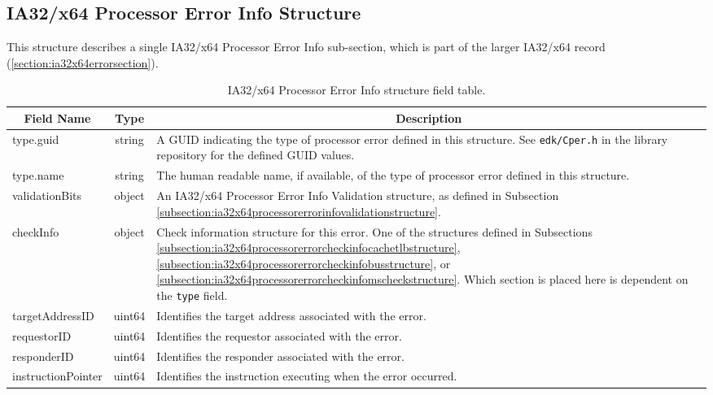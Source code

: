 \documentclass{report}
\newcommand*{\thead}[1]{\multicolumn{1}{|c|}{\bfseries #1}}
\newcommand*{\jsontable}[1]{
    \begin{table}[!ht]
    \label{#1}
    \centering
    \begin{adjustbox}{center}
    \begin{tabular}{|l|c|p{8cm}|}
    \hline
    \thead{Field Name} & \thead{Type} & \thead{Description} \\
    \hline
}
\newcommand*{\jsontableend}[1]{
    \hline
    \end{tabular}
    \end{adjustbox}
    \caption{#1}
    \label{table:#1}
    \end{table}
    \FloatBarrier
}
\begin{document}
\subsection{IA32/x64 Processor Error Info Structure}
\label{subsection:ia32x64processorerrorinfostructure}
This structure describes a single IA32/x64 Processor Error Info sub-section, which is part of the larger IA32/x64 record (\ref{section:ia32x64errorsection}).
\jsontable{table:ia32x64processorerrorinfostructure}
type.guid & string & A GUID indicating the type of processor error defined in this structure. See \texttt{edk/Cper.h} in the library repository for the defined GUID values.\\
type.name & string & The human readable name, if available, of the type of processor error defined in this structure.\\
\hline
validationBits & object & An IA32/x64 Processor Error Info Validation structure, as defined in Subsection \ref{subsection:ia32x64processorerrorinfovalidationstructure}.\\
\hline
checkInfo & object & Check information structure for this error. One of the structures defined in Subsections \ref{subsection:ia32x64processorerrorcheckinfocachetlbstructure}, \ref{subsection:ia32x64processorerrorcheckinfobusstructure}, or \ref{subsection:ia32x64processorerrorcheckinfomscheckstructure}. Which section is placed here is dependent on the \texttt{type} field.\\
\hline
targetAddressID & uint64 & Identifies the target address associated with the error.\\
\hline
requestorID & uint64 & Identifies the requestor associated with the error.\\
\hline
responderID & uint64 & Identifies the responder associated with the error.\\
\hline
instructionPointer & uint64 & Identifies the instruction executing when the error occurred.\\ 
\jsontableend{IA32/x64 Processor Error Info structure field table.}

\end{document}
